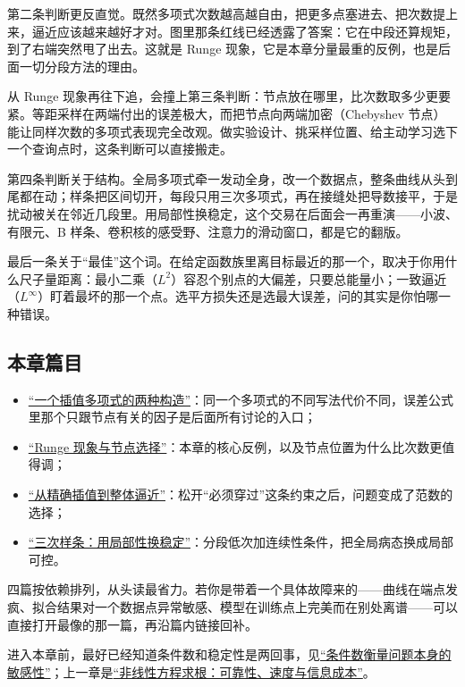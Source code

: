 第二条判断更反直觉。既然多项式次数越高越自由，把更多点塞进去、把次数提上来，逼近应该越来越好才对。图里那条红线已经透露了答案：它在中段还算规矩，到了右端突然甩了出去。这就是 Runge 现象，它是本章分量最重的反例，也是后面一切分段方法的理由。

从 Runge 现象再往下追，会撞上第三条判断：节点放在哪里，比次数取多少更要紧。等距采样在两端付出的误差极大，而把节点向两端加密（Chebyshev 节点）能让同样次数的多项式表现完全改观。做实验设计、挑采样位置、给主动学习选下一个查询点时，这条判断可以直接搬走。

第四条判断关于结构。全局多项式牵一发动全身，改一个数据点，整条曲线从头到尾都在动；样条把区间切开，每段只用三次多项式，再在接缝处把导数接平，于是扰动被关在邻近几段里。用局部性换稳定，这个交易在后面会一再重演——小波、有限元、B 样条、卷积核的感受野、注意力的滑动窗口，都是它的翻版。

最后一条关于``最佳''这个词。在给定函数族里离目标最近的那一个，取决于你用什么尺子量距离：最小二乘（\(L^2\)）容忍个别点的大偏差，只要总能量小；一致逼近（\(L^\infty\)）盯着最坏的那一个点。选平方损失还是选最大误差，问的其实是你怕哪一种错误。

\subsection{本章篇目}

\begin{itemize}
\tightlist
\item \hyperref[sec:08-Numerical-Analysis/03-Interpolation-and-Approximation/01]{``一个插值多项式的两种构造''}：同一个多项式的不同写法代价不同，误差公式里那个只跟节点有关的因子是后面所有讨论的入口；
\item \hyperref[sec:08-Numerical-Analysis/03-Interpolation-and-Approximation/02]{``Runge 现象与节点选择''}：本章的核心反例，以及节点位置为什么比次数更值得调；
\item \hyperref[sec:08-Numerical-Analysis/03-Interpolation-and-Approximation/03]{``从精确插值到整体逼近''}：松开``必须穿过''这条约束之后，问题变成了范数的选择；
\item \hyperref[sec:08-Numerical-Analysis/03-Interpolation-and-Approximation/04]{``三次样条：用局部性换稳定''}：分段低次加连续性条件，把全局病态换成局部可控。
\end{itemize}

四篇按依赖排列，从头读最省力。若你是带着一个具体故障来的——曲线在端点发疯、拟合结果对一个数据点异常敏感、模型在训练点上完美而在别处离谱——可以直接打开最像的那一篇，再沿篇内链接回补。

进入本章前，最好已经知道条件数和稳定性是两回事，见\hyperref[sec:08-Numerical-Analysis/01-Floating-Point-and-Error/03]{``条件数衡量问题本身的敏感性''}；上一章是\hyperref[ch:062]{``非线性方程求根：可靠性、速度与信息成本''}。
